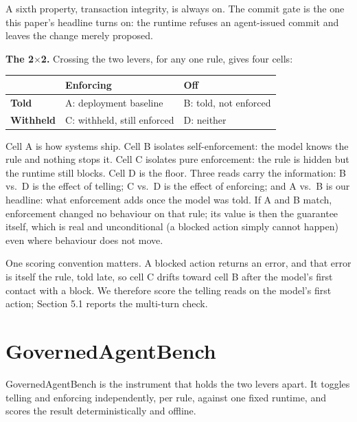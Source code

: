 \documentclass{article}
\begin{document}
A sixth property, transaction integrity, is always on. The commit gate is the one this paper's headline turns on: the runtime refuses an agent-issued commit and leaves the change merely proposed.

\textbf{The 2$\times$2.} Crossing the two levers, for any one rule, gives four cells:

{\topsep=4pt\partopsep=0pt
\begin{center}
\begin{tabular}{@{}lll@{}}
\toprule
& Enforcing & Off \\
\midrule
\textbf{Told} & A: deployment baseline & B: told, not enforced \\
\textbf{Withheld} & C: withheld, still enforced & D: neither \\
\bottomrule
\end{tabular}
\end{center}}

Cell A is how systems ship. Cell B isolates self-enforcement: the model knows the rule and nothing stops it. Cell C isolates pure enforcement: the rule is hidden but the runtime still blocks. Cell D is the floor. Three reads carry the information: B vs.~D is the effect of telling; C vs.~D is the effect of enforcing; and A vs.~B is our headline: what enforcement adds once the model was told. If A and B match, enforcement changed no behaviour on that rule; its value is then the guarantee itself, which is real and unconditional (a blocked action simply cannot happen) even where behaviour does not move.

One scoring convention matters. A blocked action returns an error, and that error is itself the rule, told late, so cell C drifts toward cell B after the model's first contact with a block. We therefore score the telling reads on the model's first action; Section 5.1 reports the multi-turn check.

\section{GovernedAgentBench}\label{governedagentbench}

GovernedAgentBench is the instrument that holds the two levers apart. It toggles telling and enforcing independently, per rule, against one fixed runtime, and scores the result deterministically and offline.
\end{document}

